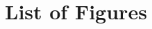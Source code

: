 











\chapter{List of Figures}
\vspace{-0.3cm}
\makeatletter
{}%
\makeatother
\cleardoublepage

	
	
